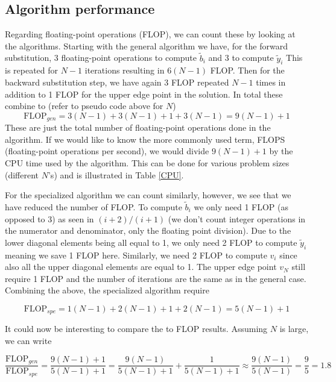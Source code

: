 \documentclass[12pt]{article}
\numberwithin{figure}{section}
\numberwithin{table}{section}
\begin{document}
\subsection{Algorithm performance}
\noindent Regarding floating-point operations (FLOP), we can count these by looking at the algorithms. Starting with the general algorithm we have, for the forward substitution, 3 floating-point operations to compute $\tilde{b}_i$ and 3 to compute $\tilde{y}_i$ This is repeated for $N-1$ iterations resulting in $6(N-1)$ FLOP. Then for the backward substitution step, we have again 3 FLOP repeated $N-1$ times in addition to 1 FLOP for the upper edge point in the solution. In total these combine to (refer to pseudo code above for $N$)
\begin{equation*}
	\text{FLOP}_{gen}=3(N-1)+3(N-1)+1+3(N-1)=9(N-1)+1
\end{equation*}
These are just the total number of floating-point operations done in the algorithm. If we would like to know the more commonly used term, FLOPS (floating-point operations per second), we would divide $9(N-1)+1$ by the CPU time used by the algorithm. This can be done for various problem sizes (different $N$'s) and is illustrated in Table \ref{CPU}.
\vspace{0.35cm}

\noindent For the specialized algorithm we can count similarly, however, we see that we have reduced the number of FLOP. To compute $\tilde{b}_i$ we only need 1 FLOP (as opposed to 3) as seen in $(i+2)/(i+1)$ (we don't count integer operations in the numerator and denominator, only the floating point division). Due to the lower diagonal elements being all equal to 1, we only need 2 FLOP to compute $\tilde{y}_i$ meaning we save 1 FLOP here. Similarly, we need 2 FLOP to compute $v_i$ since also all the upper diagonal elements are equal to 1. The upper edge point $v_N$ still require 1 FLOP and the number of iterations are the same as in the general case. Combining the above, the specialized algorithm require

\begin{equation*}
	\text{FLOP}_{spe}=1(N-1)+2(N-1)+1+2(N-1)=5(N-1)+1
\end{equation*}

\noindent It could now be interesting to compare the to FLOP results. Assuming $N$ is large, we can write

\begin{equation*}
\frac{\text{FLOP}_{gen}}{\text{FLOP}_{spe}}=\frac{9(N-1)+1}{5(N-1)+1}=\frac{9(N-1)}{5(N-1)+1}+\frac{1}{5(N-1)+1}\approx\frac{9(N-1)}{5(N-1)}=\frac{9}{5}=1.8
\end{equation*}
\end{document}
